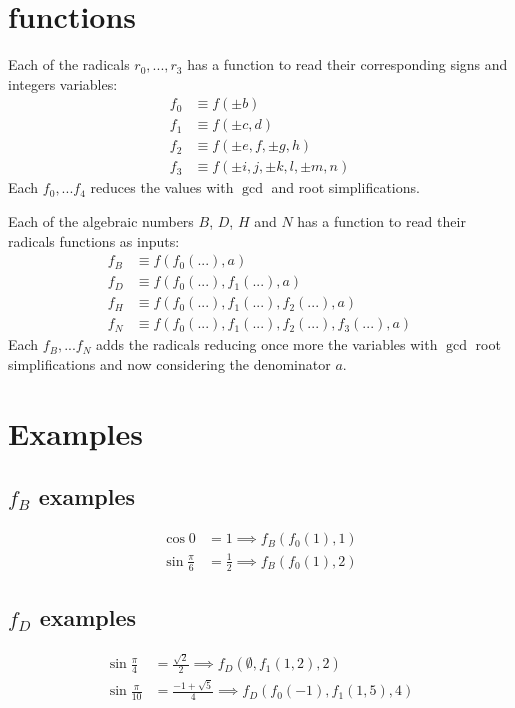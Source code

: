 \documentclass{article}
\begin{document}
\section{functions}
Each of the radicals $r_0,...,r_3$ has a function to read their corresponding signs and integers variables:
\begin{align}
f_0 &\equiv f(\pm b)\\
f_1 &\equiv f(\pm c, d)\\
f_2 &\equiv f(\pm e, f, \pm g, h)\\
f_3 &\equiv f(\pm i, j, \pm k, l, \pm m, n)
\end{align}
Each $f_0,...f_4$ reduces the values with $\gcd$ and root simplifications.

Each of the algebraic numbers $B$, $D$, $H$ and $N$ has a function to read their radicals functions as inputs:
\begin{align}
f_B &\equiv f(f_0(...), a)\\
f_D &\equiv f(f_0(...), f_1(...), a)\\
f_H &\equiv f(f_0(...), f_1(...), f_2(...), a)\\
f_N &\equiv f(f_0(...), f_1(...), f_2(...), f_3(...), a)
\end{align}
Each $f_B,...f_N$ adds the radicals reducing once more the variables with $\gcd$ root simplifications
and now considering the denominator $a$.

\section{Examples}

\subsection{$f_B$ examples}
\begin{align}
\cos{0}             &= 1           \implies f_B(f_0(1),1)\\
\sin{\frac{\pi}{6}} &= \frac{1}{2} \implies f_B(f_0(1),2)
\end{align}

\subsection{$f_D$ examples}
\begin{align}
\sin{\frac{\pi}{4}}  &= \frac{\sqrt{2}}{2}    \implies f_D(\emptyset,f_1(1,2),2)\\
\sin{\frac{\pi}{10}} &= \frac{-1+\sqrt{5}}{4} \implies f_D(f_0(-1),f_1(1,5),4)
\end{align}
\end{document}

